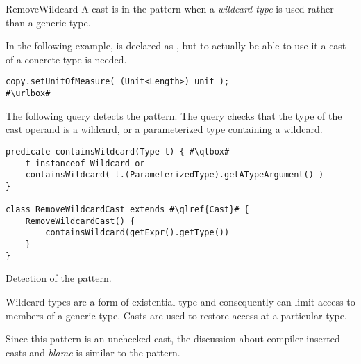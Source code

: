 \begin{pattern}{RemoveWildcard}
A cast is in the \thisp{} pattern when a \emph{wildcard type} is used rather than a generic type.


\instances{}
In the following example,%
\def\urlvar{http://bit.ly/eclipse_jetty_project_2WMI0Ld}
 is declared as ,
but to actually be able to use it a cast of a concrete type is needed.

\begin{verbatim}
copy.setUnitOfMeasure( (Unit<Length>) unit );
#\urlbox#
\end{verbatim}


\detection{}
The following query detects the \thisp{} pattern.
The query checks that the type of the cast operand is a wildcard,
or a parameterized type containing a wildcard.

\begin{listing}
\begin{verbatim}
predicate containsWildcard(Type t) { #\qlbox#
	t instanceof Wildcard or
	containsWildcard( t.(ParameterizedType).getATypeArgument() )
}

class RemoveWildcardCast extends #\qlref{Cast}# {
	RemoveWildcardCast() {
		containsWildcard(getExpr().getType())
	}
}
\end{verbatim}
\caption{Detection of the \thisp{} pattern.}
\label{lst:ql:RemoveWildcardCast}
\end{listing}


\issues{}
Wildcard types are a form of existential type and consequently can limit
access to members of a generic type.
Casts are used to restore access at a particular type.

Since this pattern is an unchecked cast,
the discussion about compiler-inserted casts and \emph{blame} is similar to the  pattern.

\end{pattern}
